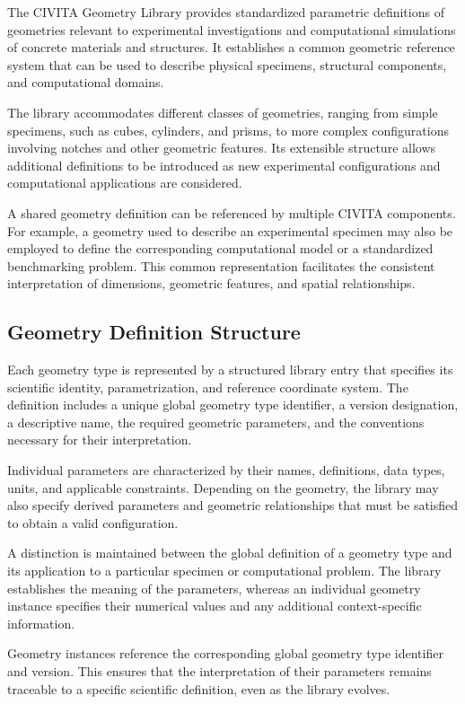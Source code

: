 The CIVITA Geometry Library provides standardized parametric definitions of geometries relevant to experimental investigations and computational simulations of concrete materials and structures. It establishes a common geometric reference system that can be used to describe physical specimens, structural components, and computational domains.

The library accommodates different classes of geometries, ranging from simple specimens, such as cubes, cylinders, and prisms, to more complex configurations involving notches and other geometric features. Its extensible structure allows additional definitions to be introduced as new experimental configurations and computational applications are considered.

A shared geometry definition can be referenced by multiple CIVITA components. For example, a geometry used to describe an experimental specimen may also be employed to define the corresponding computational model or a standardized benchmarking problem. This common representation facilitates the consistent interpretation of dimensions, geometric features, and spatial relationships.

\subsection{Geometry Definition Structure}

Each geometry type is represented by a structured library entry that specifies its scientific identity, parametrization, and reference coordinate system. The definition includes a unique global geometry type identifier, a version designation, a descriptive name, the required geometric parameters, and the conventions necessary for their interpretation.

Individual parameters are characterized by their names, definitions, data types, units, and applicable constraints. Depending on the geometry, the library may also specify derived parameters and geometric relationships that must be satisfied to obtain a valid configuration.

A distinction is maintained between the global definition of a geometry type and its application to a particular specimen or computational problem. The library establishes the meaning of the parameters, whereas an individual geometry instance specifies their numerical values and any additional context-specific information.

Geometry instances reference the corresponding global geometry type identifier and version. This ensures that the interpretation of their parameters remains traceable to a specific scientific definition, even as the library evolves.

